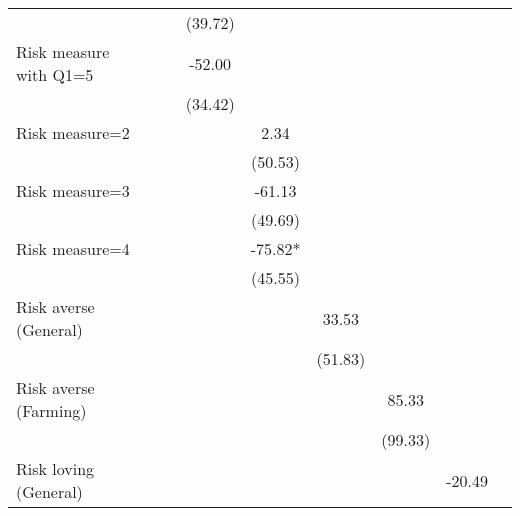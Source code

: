 \begin{table}[htbp]
\begin{threeparttable}
\begin{tabular}{l cccccccc}
                    &               &               &     (39.72)   &               &               &               &               &               \\
Risk measure with Q1=5&               &               &      -52.00   &               &               &               &               &               \\
                    &               &               &     (34.42)   &               &               &               &               &               \\
Risk measure=2      &               &               &               &        2.34   &               &               &               &               \\
                    &               &               &               &     (50.53)   &               &               &               &               \\
Risk measure=3      &               &               &               &      -61.13   &               &               &               &               \\
                    &               &               &               &     (49.69)   &               &               &               &               \\
Risk measure=4      &               &               &               &      -75.82*  &               &               &               &               \\
                    &               &               &               &     (45.55)   &               &               &               &               \\
Risk averse (General)&               &               &               &               &       33.53   &               &               &               \\
                    &               &               &               &               &     (51.83)   &               &               &               \\
Risk averse (Farming)&               &               &               &               &               &       85.33   &               &               \\
                    &               &               &               &               &               &     (99.33)   &               &               \\
Risk loving (General)&               &               &               &               &               &               &      -20.49   &               \\

\end{tabular}
\end{threeparttable}
\end{table}
